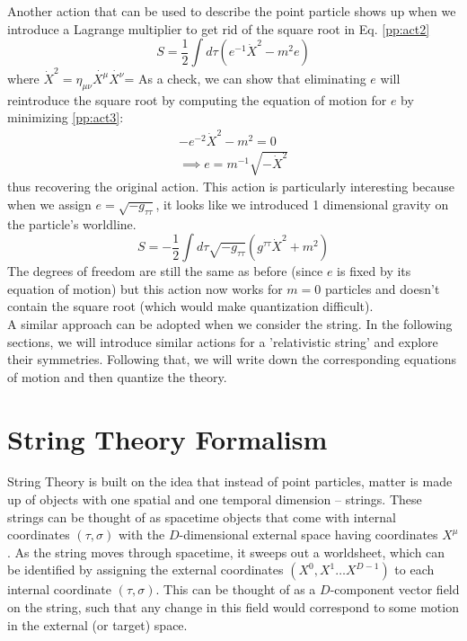 \documentclass{article}
\providecommand{\brak}[1]{\ensuremath{\left(#1\right)}} %
\begin{document}
Another action that can be used to describe the point particle shows up when we introduce a Lagrange multiplier to get rid of the square root in Eq. \eqref{pp:act2}
\begin{equation}
	S = \frac{1}{2}\int d\tau \left({e^{-1}}\dot{X}^2 - m^2e \right) \label{pp:act3}
\end{equation}
where $\dot{X}^2 = \eta_{\mu\nu}\dot{X^\mu}\dot{X^\nu}$= As a check, we can show that eliminating $e$ will reintroduce the square root by computing the equation of motion for $e$ by minimizing \eqref{pp:act3}:
\begin{align}
    -e^{-2}\dot{X}^2-m^2=0\\
    \implies e = m^{-1} \sqrt{-\dot{X}^2}
\end{align}
thus recovering the original action. This action is particularly interesting because when we assign $e=\sqrt{-g_{\tau\tau}}$, it looks like we introduced 1 dimensional gravity on the particle's worldline. 
\begin{equation}
	S = -\frac{1}{2} \int d\tau \sqrt{-g_{\tau\tau}}\brak{g^{\tau\tau}\dot{X}^2 + m^2}
\end{equation}
The degrees of freedom are still the same as before (since $e$ is fixed by its equation of motion) but this action now works for $m=0$ particles and doesn't contain the square root (which would make quantization difficult).\\

A similar approach can be adopted when we consider the string. In the following sections, we will introduce similar actions for a 'relativistic string' and explore their symmetries. Following that, we will write down the corresponding equations of motion and then quantize the theory.  
\section{String Theory Formalism}
String Theory is built on the idea that instead of point particles, matter is made up of objects with one spatial and one temporal dimension -- strings. These strings can be thought of as spacetime objects that come with internal coordinates $(\tau,\sigma)$  with the $D$-dimensional external space having coordinates $X^\mu$. As the string moves through spacetime, it sweeps out a worldsheet, which can be identified by assigning the external coordinates $(X^0,X^1\dots X^{D-1})$ to each internal coordinate $(\tau,\sigma)$. This can be thought of as a $D$-component vector field on the string, such that any change in this field would correspond to some motion in the external (or target) space.\\
\end{document}
